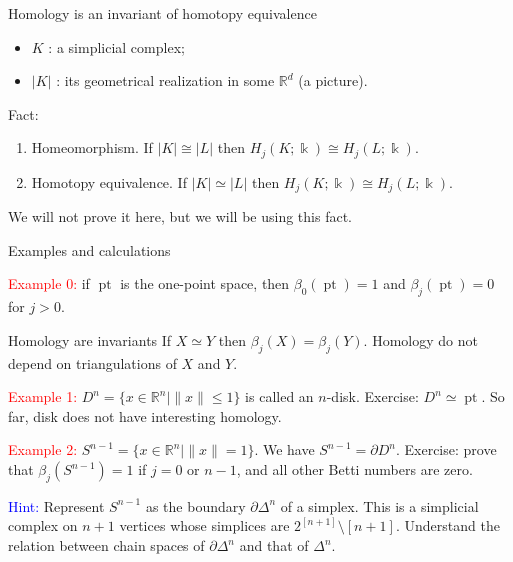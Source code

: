 \documentclass[10pt]{beamer}
\DeclareMathOperator{\pt}{pt}
\newcommand{\ko}{\Bbbk}
\newcommand{\Ro}{\mathbb{R}}
\newcommand{\dd}{\partial}
\begin{document}
\begin{frame}{Homology is an invariant of homotopy equivalence}

\begin{itemize}
  \item $K$ : a simplicial complex;
  \item $|K|$ : its geometrical realization in some $\Ro^d$ (a picture).
\end{itemize}

\begin{block}{Fact:}
\begin{enumerate}
  \item Homeomorphism. If $|K|\cong |L|$ then $H_j(K;\ko)\cong H_j(L;\ko)$.
  \item Homotopy equivalence. If $|K|\simeq |L|$ then $H_j(K;\ko)\cong H_j(L;\ko)$.
\end{enumerate}
\end{block}

We will not prove it here, but we will be using this fact.

\end{frame}




\begin{frame}{Examples and calculations}

\textcolor{red}{Example 0:} if $\pt$ is the one-point space, then $\beta_0(\pt)=1$ and $\beta_j(\pt)=0$ for $j>0$.

\begin{block}{Homology are invariants}
If $X\simeq Y$ then $\beta_j(X)= \beta_j(Y)$. Homology do not depend on triangulations of $X$ and $Y$.
\end{block}
\pause

\textcolor{red}{Example 1:} $D^n=\{x\in \Ro^n\mid \|x\|\leqslant 1\}$ is called an $n$-disk. Exercise: $D^n\simeq \pt$. So far, disk does not have interesting homology.
\pause

\textcolor{red}{Example 2:} $S^{n-1}=\{x\in \Ro^n\mid \|x\|=1\}$. We have $S^{n-1}=\dd D^n$. Exercise: prove that $\beta_j(S^{n-1})=1$ if $j=0$ or $n-1$, and all other Betti numbers are zero.

\textcolor{blue}{Hint:} Represent $S^{n-1}$ as the boundary $\dd\Delta^n$ of a simplex. This is a simplicial complex on $n+1$ vertices whose simplices are $2^{[n+1]}\setminus[n+1]$. Understand the relation between chain spaces of $\dd\Delta^n$ and that of $\Delta^n$.

\end{frame}
\end{document}
